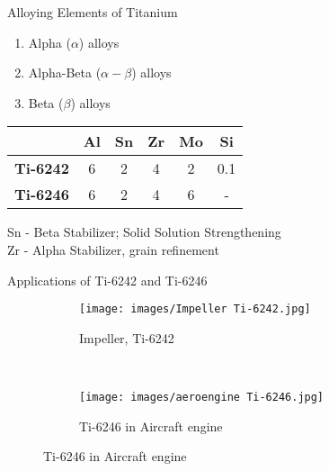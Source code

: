 \documentclass[10pt]{beamer}
\begin{document}
{%

\begin{frame}[fragile]{Alloying Elements of Titanium}

\begin{enumerate}
\item Alpha ($\alpha$) alloys
\item Alpha-Beta ($\alpha-\beta$) alloys
\item Beta ($\beta$) alloys
\end{enumerate}

\begin{table}[]
\centering
\begin{tabular}{@{}cccccc@{}}
\toprule
 & \textbf{Al} & \textbf{Sn} & \textbf{Zr} & \textbf{Mo} & \textbf{Si} \\ \midrule
\textbf{Ti-6242} & 6 & 2 & 4 & 2 & 0.1 \\
\textbf{Ti-6246} & 6 & 2 & 4 & 6 & - \\ \bottomrule
\end{tabular}
\end{table}
Sn - Beta Stabilizer; Solid Solution Strengthening \\
Zr - Alpha Stabilizer, grain refinement
\end{frame}
}

{%
\begin{frame}[fragile]{Applications of Ti-6242 and Ti-6246}

\begin{figure}[H]
    \centering
    \begin{subfigure}{0.35\textwidth}
        \texttt{[image: images/Impeller Ti-6242.jpg]}
        \caption{Impeller, Ti-6242}
        \end{subfigure}
    ~
    \begin{subfigure}{0.45\textwidth}
        \texttt{[image: images/aeroengine Ti-6246.jpg]}
        \caption{Ti-6246 in Aircraft engine}
    \end{subfigure}
  
    
\end{figure}

\end{frame}
}
\end{document}
